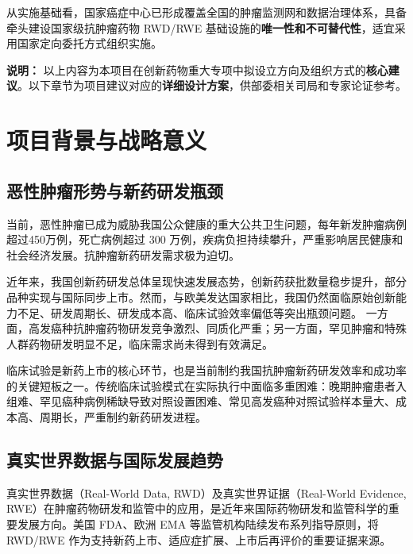 \documentclass[12pt, a4paper, fontset=mac]{ctexart} %
\begin{document}
从实施基础看，国家癌症中心已形成覆盖全国的肿瘤监测网和数据治理体系，具备牵头建设国家级抗肿瘤药物 RWD/RWE 基础设施的\textbf{唯一性和不可替代性}，适宜采用国家定向委托方式组织实施。

\vspace{1em}
\noindent\textbf{说明：}  
以上内容为本项目在创新药物重大专项中拟设立方向及组织方式的\textbf{核心建议}。以下章节为项目建议对应的\textbf{详细设计方案}，供部委相关司局和专家论证参考。

\section{项目背景与战略意义}

\subsection{恶性肿瘤形势与新药研发瓶颈}

当前，恶性肿瘤已成为威胁我国公众健康的重大公共卫生问题，每年新发肿瘤病例超过450万例，死亡病例超过 300 万例，疾病负担持续攀升，严重影响居民健康和社会经济发展\cite{nhc_innovative_drug_guide_2025}。抗肿瘤新药研发需求极为迫切。

近年来，我国创新药研发总体呈现快速发展态势，创新药获批数量稳步提升，部分品种实现与国际同步上市。然而，与欧美发达国家相比，我国仍然面临原始创新能力不足、研发周期长、研发成本高、临床试验效率偏低等突出瓶颈问题\cite{most_guide_2026}。
一方面，高发癌种抗肿瘤药物研发竞争激烈、同质化严重；另一方面，罕见肿瘤和特殊人群药物研发明显不足，临床需求尚未得到有效满足。

临床试验是新药上市的核心环节，也是当前制约我国抗肿瘤新药研发效率和成功率的关键短板之一。传统临床试验模式在实际执行中面临多重困难：晚期肿瘤患者入组难、罕见癌种病例稀缺导致对照设置困难、常见高发癌种对照试验样本量大、成本高、周期长，严重制约新药研发进程\cite{arondekar_oncology_rwe}。

\subsection{真实世界数据与国际发展趋势}

真实世界数据（Real-World Data, RWD）及真实世界证据（Real-World Evidence, RWE）在肿瘤药物研发和监管中的应用，是近年来国际药物研发和监管科学的重要发展方向\cite{sherman_nejm_rwe_2016,concato_nejm_rwe_2022,dang_rwe_primer_2023,costa_frontiers_rwe_2025}。美国 FDA、欧洲 EMA 等监管机构陆续发布系列指导原则，将 RWD/RWE 作为支持新药上市、适应症扩展、上市后再评价的重要证据来源\cite{FDA-RWE-Framework,EMA-External-Control,corrigan_curay_jama_2018,corrigan_curay2018_rwe}。
\end{document}
